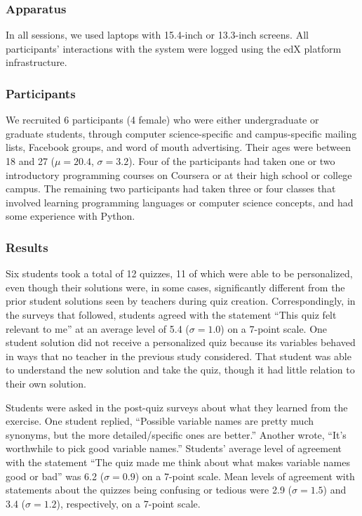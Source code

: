 \subsubsection{Apparatus}

In all sessions, we used laptops with 15.4-inch or 13.3-inch screens. All participants' interactions with the system were logged using the edX platform infrastructure.

\subsubsection{Participants}

We recruited 6 participants (4 female) who were either undergraduate or graduate students, through computer science-specific and campus-specific mailing lists, Facebook groups, and word of mouth advertising. Their ages were between 18 and 27 ($\mu=20.4$, $\sigma=3.2$). Four of the participants had taken one or two introductory programming courses on Coursera or at their high school or college campus. The remaining two participants had taken three or four classes that involved learning programming languages or computer science concepts, and had some experience with Python.

\subsubsection{Results}

Six students took a total of 12 quizzes, 11 of which were able to be personalized, even though their solutions were, in some cases, significantly different from the prior student solutions seen by teachers during quiz creation. Correspondingly, in the surveys that followed, students agreed with the statement ``This quiz felt relevant to me'' at an average level of 5.4 ($\sigma = 1.0$) on a 7-point scale. One student solution did not receive a personalized quiz because its variables behaved in ways that no teacher in the previous study considered. That student was able to understand the new solution and take the quiz, though it had little relation to their own solution.

Students were asked in the post-quiz surveys about what they learned from the exercise. One student replied, ``Possible variable names are pretty much synonyms, but the more detailed/specific ones are better.'' Another wrote, ``It's worthwhile to pick good variable names.'' Students' average level of agreement with the statement ``The quiz made me think about what makes variable names good or bad'' was 6.2 ($\sigma = 0.9$) on a 7-point scale. Mean levels of agreement with statements about the quizzes being confusing or tedious were 2.9 ($\sigma = 1.5$) and 3.4 ($\sigma = 1.2$), respectively, on a 7-point scale.

